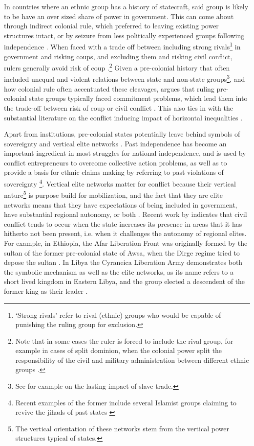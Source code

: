 \documentclass[12pt]{article}
\begin{document}
In countries where an ethnic group has a history of statecraft, said group is
likely to be have an over sized share of power in government. This can come
about through indirect colonial rule, which preferred to leaving existing power
structures intact, or by seizure from less politically experienced groups
following independence \citep{Paine2019}. When faced with a trade off between
including strong rivals\footnote{`Strong rivals' refer to rival (ethnic) groups
who would be capable of punishing the ruling group for exclusion.} in government
and risking coups, and excluding them and risking civil conflict, rulers
generally avoid risk of coup \citep{Paine2019, Powell_2014,
	Roessler_2011}.\footnote{Note that in some cases the ruler is forced to
include the rival group, for example in cases of split dominion, when the
colonial power split the responsibility of the civil and military administration
between different ethnic groups \citep{Paine2019}.} Given a pre-colonial history
that often included unequal and violent relations between state and non-state
groups\footnote{See for example \citet{Nunn2008} on the lasting impact of slave
trade.}, and how colonial rule often accentuated these cleavages,
\citet{Paine2019} argues that ruling pre-colonial state groups typically faced
commitment problems, which lead them into the trade-off between risk of coup or
civil conflict \citep{Paine2019}. This also ties in with the substantial
literature on the conflict inducing impact of horizontal inequalities
\citep{CEDERMAN_2011}.

Apart from institutions, pre-colonial states potentially leave behind symbols of
sovereignty and vertical elite networks \citep{Wishman}. Past independence has
become an important ingredient in most struggles for national independence, and
is used by conflict entrepreneurs to overcome collective action problems, as
well as to provide a basis for ethnic claims making by referring to past
violations of sovereignty \citep{Ahram2019, Shelef2016}\footnote{Recent examples
	of the former include several Islamist groups claiming to revive the
	jihads of past states \citep{Zenn2015}}. Vertical elite networks matter
	for conflict because their vertical nature\footnote{The vertical
		orientation of these networks stem from the vertical power
	structures typical of states.} is purpose build for mobilization, and
	the fact that they are elite networks means that they have expectations
	of being included in government, have substantial regional autonomy, or
	both \citep{Wishman}. Recent work by \citet{Ying_2020} indicates that
	civil conflict tends to occur when the state increases its presence in
	areas that it has hitherto not been present, i.e. when it challenges the
	autonomy of regional elites. For example, in Ethiopia, the Afar
	Liberation Front was originally formed by the sultan of the former
	pre-colonial state of Awsa, when the Dirge regime tried to depose the
	sultan \citep{Shehim1985, Hanfare2011}.  In Libya the Cyraneica
	Liberation Army demonstrates both the symbolic mechanism as well as the
	elite networks, as its name refers to a short lived kingdom in Eastern
	Libya, and the group elected a descendent of the former king as their
	leader \citep{Ahram2019}.
\end{document}
